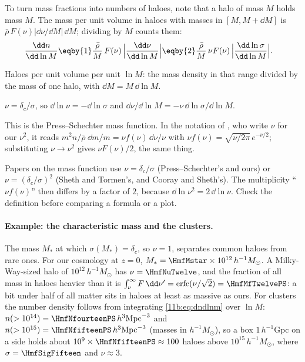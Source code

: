 To turn mass fractions into numbers of haloes, note that a halo of mass $M$ holds
mass $M$. The mass per unit volume in haloes with masses in $[M,M+\dd M]$ is
$\bar\rho\,F(\nu)|\dd\nu/\dd M|\,\dd M$; dividing by $M$ counts them:
\begin{align}
  \frac{\dd n}{\dd\ln M}
  &\eqby{1}\frac{\bar\rho}{M}\,F(\nu)\,\Bigl|\frac{\dd\nu}{\dd\ln M}\Bigr|
   \eqby{2}\frac{\bar\rho}{M}\,\nu F(\nu)\,
     \Bigl|\frac{\dd\ln\sigma}{\dd\ln M}\Bigr| .
  \label{11b:eq:dndlnm}
\end{align}
\begin{explain}
  \item Haloes per unit volume per unit $\ln M$: the mass density in that range
        divided by the mass of one halo, with $\dd M=M\,\dd\ln M$.
  \item $\nu=\delta_c/\sigma$, so $\dd\ln\nu=-\dd\ln\sigma$ and
        $\dd\nu/\dd\ln M=-\nu\,\dd\ln\sigma/\dd\ln M$.
\end{explain}
This is the Press--Schechter mass function. In the notation of
, who write $\nu$ for our $\nu^2$, it reads
$m^2n/\bar\rho\;\dd m/m=\nu f(\nu)\,\dd\nu/\nu$ with
$\nu f(\nu)=\sqrt{\nu/2\pi}\,e^{-\nu/2}$; substituting $\nu\to\nu^2$ gives
$\nu F(\nu)/2$, the same thing.

\begin{pitfall}
Papers on the mass function use $\nu=\delta_c/\sigma$ (Press--Schechter's and
ours) or $\nu=(\delta_c/\sigma)^2$ (Sheth and Tormen's, and Cooray and Sheth's).
The multiplicity ``$\nu f(\nu)$'' then differs by a factor of $2$, because
$\dd\ln\nu^2=2\,\dd\ln\nu$. Check the definition before comparing a formula or a
plot.
\end{pitfall}

\paragraph{Example: the characteristic mass and the clusters.}
The mass $M_*$ at which $\sigma(M_*)=\delta_c$, so $\nu=1$, separates common haloes
from rare ones. For our cosmology at $z=0$, $M_*=\HmfMstar\times10^{12}\,h^{-1}
M_\odot$. A Milky-Way-sized halo of $10^{12}\,h^{-1}M_\odot$ has
$\nu=\HmfNuTwelve$, and the fraction of all mass in haloes heavier than it is
$\int_\nu^\infty F\,\dd\nu'=\operatorname{erfc}(\nu/\sqrt2)=\HmfMfTwelvePS$: a bit
under half of all matter sits in haloes at least as massive as ours. For clusters
the number density follows from integrating \eqref{11b:eq:dndlnm} over $\ln M$:
$n(>10^{14})=\HmfNfourteenPS\,h^3\mathrm{Mpc}^{-3}$ and
$n(>10^{15})=\HmfNfifteenPS\,h^3\mathrm{Mpc}^{-3}$ (masses in $h^{-1}M_\odot$), so
a box $1\,h^{-1}$Gpc on a side holds about $10^9\times\HmfNfifteenPS\approx100$
haloes above $10^{15}\,h^{-1}M_\odot$, where $\sigma=\HmfSigFifteen$ and
$\nu\approx3$.

